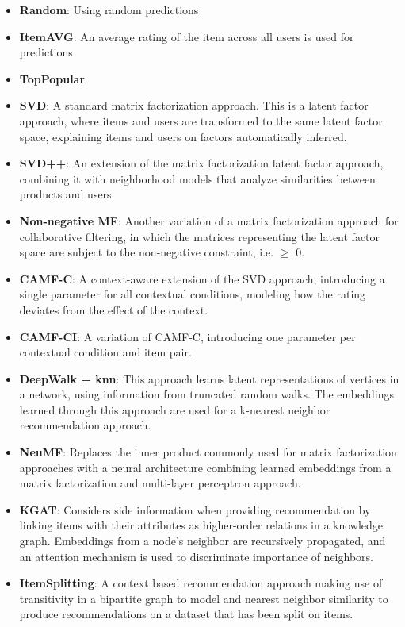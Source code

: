 \begin{itemize}
    \item \textbf{Random}: Using random predictions
    \item \textbf{ItemAVG}: An average rating of the item across all users is used for predictions
    \item \textbf{TopPopular}
    \item \textbf{SVD\cite{standardMF}}: A standard matrix factorization approach. This is a latent factor approach, where items and users are transformed to the same latent factor space, explaining items and users on factors automatically inferred.
    \item \textbf{SVD++\cite{svd++}}: An extension of the matrix factorization latent factor approach, combining it with neighborhood models that analyze similarities between products and users.
    \item \textbf{Non-negative MF\cite{NMF}}: Another variation of a matrix factorization approach for collaborative filtering, in which the matrices representing the latent factor space are subject to the non-negative constraint, i.e. $\geq$ 0.
    \item \textbf{CAMF-C\cite{baltrunasCAMF}}: A context-aware extension of the SVD approach, introducing a single parameter for all contextual conditions, modeling how the rating deviates from the effect of the context.
    \item \textbf{CAMF-CI\cite{baltrunasCAMF}}: A variation of CAMF-C, introducing one parameter per contextual condition and item pair.
    \item \textbf{DeepWalk + knn\cite{DeepWalk}}: This approach learns latent representations of vertices in a network, using information from truncated random walks. The embeddings learned through this approach are used for a k-nearest neighbor recommendation approach.
    \item \textbf{NeuMF\cite{neuMF}}: Replaces the inner product commonly used for matrix factorization approaches with a neural architecture combining learned embeddings from a matrix factorization and multi-layer perceptron approach.
    \item \textbf{KGAT\cite{KGAT}}: Considers side information when providing recommendation by linking items with their attributes as higher-order relations in a knowledge graph. Embeddings from a node's neighbor are recursively propagated, and an attention mechanism is used to discriminate importance of neighbors.
    \item \textbf{ItemSplitting\cite{GraphBasedCollaborativePaper}}: A context based recommendation approach making use of transitivity in a bipartite graph to model and nearest neighbor similarity to produce recommendations on a dataset that has been split on items.

\end{itemize}
